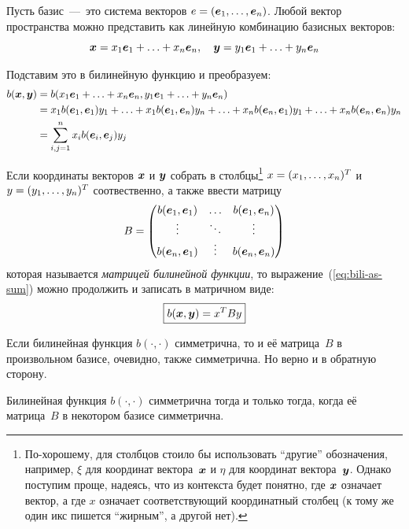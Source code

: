 \documentclass[a4paper,12pt]{article}
\begin{document}
  Пусть базис~---~это система векторов $e \hm= (\bds e_1, \ldots, \bds e_n)$.
  Любой вектор пространства можно представить как линейную комбинацию базисных векторов:
  \[
    \boldsymbol x = x_1 \boldsymbol e_1 + \ldots + x_n \boldsymbol e_n,
    \quad\boldsymbol y = y_1 \boldsymbol e_1 + \ldots + y_n \boldsymbol e_n
  \]
  
  Подставим это в билинейную функцию и преобразуем:
  \begin{equation}\label{eq:bili-as-sum}
  \begin{split}
    b(\boldsymbol x, \boldsymbol y)
    &= b(x_1 \boldsymbol e_1 + \ldots + x_n \boldsymbol e_n, y_1 \boldsymbol e_1 + \ldots + y_n \boldsymbol e_n)\\
    &= x_1 b(\boldsymbol e_1, \boldsymbol e_1) y_1 + \ldots + x_1 b(\boldsymbol e_1, \boldsymbol e_n) y_n + \ldots + x_n b(\boldsymbol e_n, \boldsymbol e_1) y_1 + \ldots + x_n b(\boldsymbol e_n, \boldsymbol e_n) y_n\\
    &= \sum_{i, j = 1}^n x_i b(\boldsymbol e_i, \boldsymbol e_j) y_j
  \end{split}
  \end{equation}
  
  Если координаты векторов $\boldsymbol x$ и $\boldsymbol y$ собрать в столбцы\footnote{По-хорошему, для столбцов стоило бы использовать ``другие'' обозначения, например, $\xi$ для координат вектора~$\boldsymbol x$ и $\eta$ для координат вектора~$\boldsymbol y$. Однако поступим проще, надеясь, что из контекста будет понятно, где $\boldsymbol x$ означает вектор, а где $x$ означает соответствующий координатный столбец (к тому же один икс пишется ``жирным'', а другой нет).} $x \hm= (x_1, \ldots, x_n)^T$ и $y \hm= (y_1, \ldots, y_n)^T$ соотвественно, а также ввести матрицу
  \[
    B = \begin{pmatrix}
      b(\boldsymbol e_1, \boldsymbol e_1) & \ldots & b(\boldsymbol e_1, \boldsymbol e_n)\\
      \vdots                & \ddots & \vdots\\
      b(\boldsymbol e_n, \boldsymbol e_1) & \vdots & b(\boldsymbol e_n, \boldsymbol e_n)
    \end{pmatrix}
  \]
  которая называется \emph{матрицей билинейной функции}, то выражение~(\ref{eq:bili-as-sum}) можно продолжить и записать в матричном виде:
  \[
    \boxed{
      b(\boldsymbol x, \boldsymbol y) = x^T B y
    }
  \]
  
  Если билинейная функция $b(\cdot, \cdot)$ симметрична, то и её матрица~$B$ в произвольном базисе, очевидно, также симметрична.
  Но верно и в обратную сторону.
  
  \begin{proposition}
    Билинейная функция $b(\cdot, \cdot)$ симметрична тогда и только тогда, когда её матрица~$B$ в некотором базисе симметрична.
  \end{proposition}
  
\end{document}
